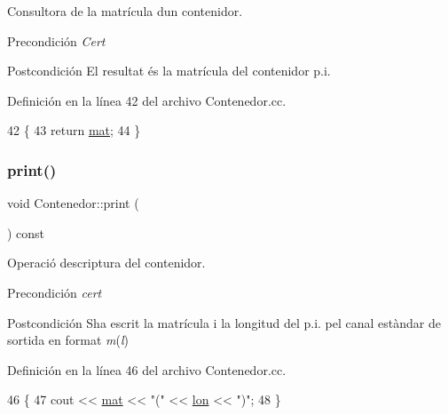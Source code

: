 Consultora de la matrícula d\textquotesingle{}un contenidor. 

\begin{DoxyPrecond}{Precondición}
{\itshape Cert} 
\end{DoxyPrecond}
\begin{DoxyPostcond}{Postcondición}
El resultat és la matrícula del contenidor p.\+i. 
\end{DoxyPostcond}


Definición en la línea 42 del archivo Contenedor.\+cc.


\begin{DoxyCode}
42                                    \{
43   \textcolor{keywordflow}{return} \hyperlink{class_contenedor_a219718cff2c0f94314defbf8d747bfa9}{mat};
44 \}
\end{DoxyCode}
\mbox{\label{class_contenedor_abcffc39995e62a9ddad113b2cfeb3279}} 
\subsubsection{\texorpdfstring{print()}{print()}}
{\footnotesize\ttfamily void Contenedor\+::print (\begin{DoxyParamCaption}{ }\end{DoxyParamCaption}) const}



Operació d\textquotesingle{}escriptura del contenidor. 

\begin{DoxyPrecond}{Precondición}
{\itshape cert} 
\end{DoxyPrecond}
\begin{DoxyPostcond}{Postcondición}
S\textquotesingle{}ha escrit la matrícula i la longitud del p.\+i. pel canal estàndar de sortida en format {\itshape m}({\itshape l}) 
\end{DoxyPostcond}


Definición en la línea 46 del archivo Contenedor.\+cc.


\begin{DoxyCode}
46                              \{
47   cout << \hyperlink{class_contenedor_a219718cff2c0f94314defbf8d747bfa9}{mat} << \textcolor{stringliteral}{"("} << \hyperlink{class_contenedor_a364e04e5a1c7787463981f192f48e4ce}{lon} << \textcolor{stringliteral}{")"};
48 \}
\end{DoxyCode}
\mbox{\label{class_contenedor_aa04efd3e3050940c96a9e1615156f4af}} 
